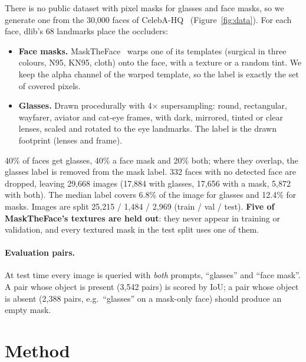 \documentclass[11pt,a4paper]{article}
\begin{document}
There is no public dataset with pixel masks for glasses and face masks, so we generate one from the
30,000 faces of CelebA-HQ~\cite{liu2015celeba} (Figure~\ref{fig:data}). For each face, dlib's 68
landmarks place the occluders:
\begin{itemize}
  \item \textbf{Face masks.} MaskTheFace~\cite{anwar2020maskedface} warps one of its templates (surgical
  in three colours, N95, KN95, cloth) onto the face, with a texture or a random tint. We keep the
  alpha channel of the warped template, so the label is exactly the set of covered pixels.
  \item \textbf{Glasses.} Drawn procedurally with 4$\times$ supersampling: round, rectangular, wayfarer,
  aviator and cat-eye frames, with dark, mirrored, tinted or clear lenses, scaled and rotated to the eye
  landmarks. The label is the drawn footprint (lenses and frame).
\end{itemize}
40\% of faces get glasses, 40\% a face mask and 20\% both; where they overlap, the glasses label is
removed from the mask label. 332 faces with no detected face are dropped, leaving 29,668 images
(17,884 with glasses, 17,656 with a mask, 5,872 with both). The median label covers 6.8\% of the image
for glasses and 12.4\% for masks. Images are split 25,215 / 1,484 / 2,969 (train / val / test).
\textbf{Five of MaskTheFace's textures are held out}: they never appear in training or validation, and
every textured mask in the test split uses one of them.

\paragraph{Evaluation pairs.} At test time every image is queried with \emph{both} prompts, ``glasses''
and ``face mask''. A pair whose object is present (3,542 pairs) is scored by IoU; a pair whose object is
absent (2,388 pairs, e.g.\ ``glasses'' on a mask-only face) should produce an empty mask.

\section{Method}
\label{sec:method}
\end{document}
